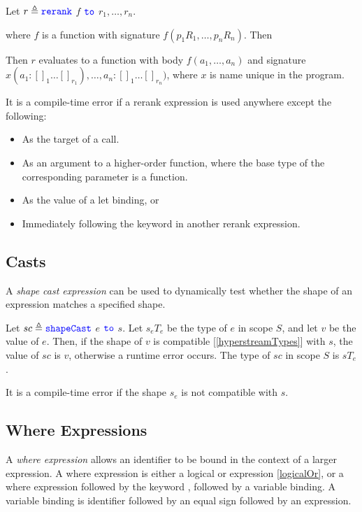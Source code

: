 \documentclass{article}
\begin{document}
{\RerankExpression

Let $r \triangleq  \texttt{\color{blue} rerank}{}$ $f$  $\texttt{\color{blue} to}{}$ $r_1, \ldots, r_n$.

where $f$ is a function with signature $f(p_1 R_1, \ldots, p_n R_n)$. Then

Then $r$ evaluates to a function with body $f(a_1, \ldots, a_n)$ and signature 
$x(a_1: []_1\ldots []_{r_1}), \ldots, a_n: []_1\ldots []_{r_n})$, where $x$ is name unique in the program.

It is a compile-time error if a rerank expression is used anywhere except the following:
\begin{itemize}
\item As the target of a call.
\item  As an argument to a higher-order function, where the base type of the corresponding parameter is a function.
\item As the value of a let binding, or 
\item Immediately following the keyword \RERANK{} in another rerank expression. 
\end{itemize}

\subsection{Casts}
\label{casts}

A {\em shape cast expression} can be used to dynamically test whether the shape of an expression matches a specified shape.

\ShapeCastExpression

Let $sc \triangleq \texttt{\color{blue} shapeCast}{}$ $e$ $\texttt{\color{blue} to}{}$ $s$.
Let $s_e T_e$ be the type of $e$ in scope $S$, and let $v$ be the value of $e$.
Then, if the shape of $v$ is compatible [\ref{hyperstreamTypes}]  with $s$, the value of $sc$ is $v$, otherwise a runtime error occurs. The type of $sc$ in scope $S$ is $s T_e$. 

It is a compile-time error if the  shape $s_e$ is not compatible with $s$.



\subsection{Where Expressions}
\label{whereExpressions}

A {\em where expression} allows an identifier to be bound in the context of a larger expression. A where expression is either a logical or expression \ref{logicalOr}, or a where expression followed by the keyword \WHERE{} , followed by a variable binding. A variable binding is identifier followed by an equal sign followed by an expression.

}
\end{document}

